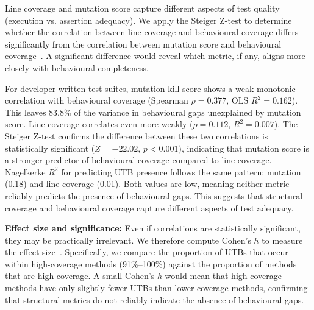 Line coverage and mutation score capture different aspects of test quality (execution vs. assertion adequacy). We apply the Steiger Z-test to determine whether the correlation between line coverage and behavioural coverage differs significantly from the correlation between mutation score and behavioural coverage~\cite{steiger1980tests}. A significant difference would reveal which metric, if any, aligns more closely with behavioural completeness.

For developer written test suites, mutation kill score shows a weak monotonic correlation with behavioural coverage (Spearman $\rho=0.377$, OLS $R^2=0.162$). This leaves 83.8\% of the variance in behavioural gaps unexplained by mutation score. 
Line coverage correlates even more weakly ($\rho=0.112$, $R^2=0.007$). 
The Steiger Z-test confirms the difference between these two correlations is statistically significant ($Z=-22.02$, $p<0.001$), indicating that mutation score is a stronger predictor of behavioural coverage compared to line coverage. 
Nagelkerke $R^2$ for predicting UTB presence follows the same pattern: mutation (0.18) and line coverage (0.01).
Both values are low, meaning neither metric reliably predicts the presence of behavioural gaps. This suggests that structural coverage and behavioural coverage capture different aspects of test adequacy.

\smallskip
\noindent\textbf{Effect size and significance:} 
%
Even if correlations are statistically significant, they may be practically irrelevant. We therefore compute Cohen's $h$ to measure the effect size~\cite{cohen1988statistical}. Specifically, we compare the proportion of UTBs that occur within high-coverage methods (91\%–100\%) against the proportion of methods that are high-coverage. A small Cohen's $h$ would mean that high coverage methods have only slightly fewer UTBs than lower coverage methods, confirming that structural metrics do not reliably indicate the absence of behavioural gaps.

